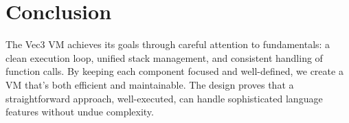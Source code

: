\section{Conclusion}\label{sec:conclusion}
The Vec3 VM achieves its goals through careful attention to fundamentals: a clean execution loop, unified stack management, and consistent handling of function calls.
By keeping each component focused and well-defined, we create a VM that's both efficient and maintainable.
The design proves that a straightforward approach, well-executed, can handle sophisticated language features without undue complexity.
